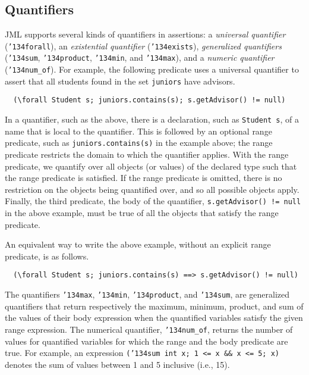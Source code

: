 \documentclass{jotarticle}
\begin{document}
\def\FORALL{\texttt{\char'134forall}}
\def\EXISTS{\texttt{\char'134exists}} 
\def\SUM{\texttt{\char'134sum}}
\def\PRODUCT{\texttt{\char'134product}}
\def\MIN{\texttt{\char'134min}} 
\def\MAX{\texttt{\char'134max}}
\def\NUMOF{\texttt{\char'134num\_of}}

\subsection{Quantifiers}
\label{sect-quantifiers}

JML supports several kinds of quantifiers in assertions: a
\emph{universal quantifier} (\FORALL), an \emph{existential
  quantifier} (\EXISTS), \emph{generalized quantifiers} ({\SUM},
{\PRODUCT}, {\MIN}, and {\MAX}), and a \emph{numeric quantifier}
(\NUMOF).  For example,
the following predicate uses a universal quantifier to assert that all students
found in the set \texttt{juniors} have advisors.

\begin{verbatim}
  (\forall Student s; juniors.contains(s); s.getAdvisor() != null)
\end{verbatim}

In a quantifier, such as the above, there is a declaration,
such as \texttt{Student s}, of a name that is local to the quantifier.
This is followed by an optional range predicate,
such as \texttt{juniors.contains(s)} in the example above;
the range predicate restricts the domain to which the
quantifier applies.
With the range predicate, we quantify over all objects (or values) of
the declared type such that the range predicate is satisfied.
If the range predicate is omitted, there is no restriction on the
objects being quantified over, and so all possible objects apply.
Finally, the third predicate, the body of the quantifier, 
\texttt{s.getAdvisor() != null} in the above example, must be true of
all the objects that satisfy the range predicate.

An equivalent way to write the above example, without an explicit range
predicate, is as follows.

\begin{verbatim}
  (\forall Student s; juniors.contains(s) ==> s.getAdvisor() != null)
\end{verbatim}

The quantifiers {\MAX}, {\MIN}, {\PRODUCT}, and {\SUM}, are
generalized quantifiers that return respectively the maximum, minimum,
product, and sum of the values of their body expression when the quantified
variables satisfy the given range expression.  The numerical
quantifier, {\NUMOF}, returns the number of values for quantified
variables for which the range and the body predicate are true.  For
example, an expression \texttt{({\SUM} int x; 1 <= x \&\& x <= 5; x)}
denotes the sum of values between 1 and 5 inclusive (i.e., 15).
\end{document}
